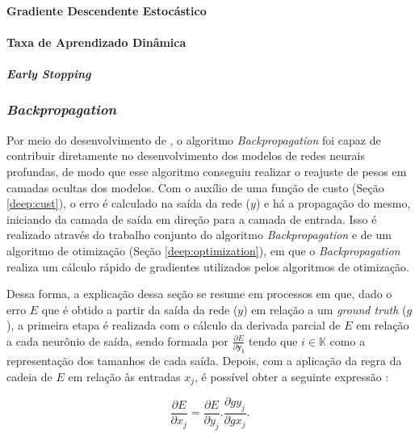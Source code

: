 \paragraph{Gradiente Descendente Estocástico}

\paragraph{Taxa de Aprendizado Dinâmica}

\paragraph{\textit{Early Stopping}}



\subsubsection{\textit{Backpropagation}}
\label{deep:backprop}

Por meio do desenvolvimento de \cite{rumelhart1986learning}, o algoritmo \textit{Backpropagation} foi capaz de contribuir diretamente no desenvolvimento dos modelos de redes neurais profundas, de modo que esse algoritmo conseguiu realizar o reajuste de pesos em camadas ocultas dos modelos. Com o auxílio de uma função de custo (Seção
\ref{deep:cust}), o erro é calculado na saída da rede ($y$) e há a propagação do mesmo, iniciando da camada de saída em direção para a camada de entrada. Isso é realizado através do trabalho conjunto do algoritmo \textit{Backpropagation} e de um algoritmo de otimização (Seção \ref{deep:optimization}), em que o \textit{Backpropagation} realiza um cálculo rápido de gradientes utilizados pelos algoritmos de otimização.

Dessa forma, a explicação dessa seção se resume em processos em que, dado o erro $E$ que é obtido a partir da saída da rede ($y$) em relação a um \textit{ground truth} ($g$), a primeira etapa é realizada com o cálculo da derivada parcial de $E$ em relação a cada neurônio de saída, sendo formada por $\frac{\partial E}{\partial \boldsymbol{y_i}}$ tendo que $i \in \mathbb{K}$ como a representação dos tamanhos de cada saída. Depois, com a aplicação da regra da cadeia de $E$ em relação às entradas $x_j$, é possível obter a seguinte expressão \cite{rumelhart1986learning}:

\begin{equation}
    \label{deep:eq:11}
    \frac{\partial E}{\partial x_j} = \frac{\partial E}{\partial y_j} . \frac{\partial g y_j}{\partial g x_j}.
\end{equation}

